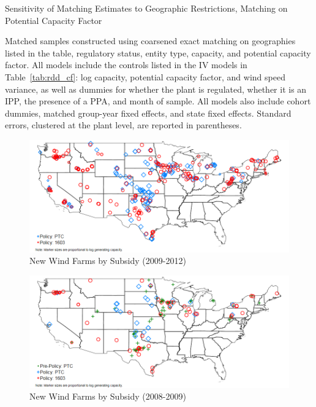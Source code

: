 \documentclass[12pt]{article}
\begin{document}
\begin{table}[h]
\begin{centering}
\caption{Sensitivity of Matching Estimates to Geographic Restrictions, Matching on Potential Capacity Factor \label{tab:matching_table_cf_ptnlcf}}

\par\end{centering}
\footnotesize

Matched samples constructed using coarsened exact matching on geographies listed in the table, regulatory status, entity type, capacity, and potential capacity factor. All models include the controls listed in the IV models in Table~\ref{tab:rdd_cf}: log capacity, potential capacity factor, and wind speed variance, as well as dummies for whether the plant is regulated, whether it is an IPP, the presence of a PPA, and month of sample. All models also include cohort dummies, matched group-year fixed effects, and state fixed effects. Standard errors, clustered at the plant level, are reported in parentheses.
\end{table}


\clearpage


\begin{figure} \centering
	\caption{New Wind Farms by Subsidy (2009-2012)\label{map:2009to2012}}
	\includegraphics[width=\textwidth]{../output/figures/map_2009to2012.png}
\end{figure}

\begin{figure} \centering
	\caption{New Wind Farms by Subsidy (2008-2009)\label{map:2008to2009}}
	\includegraphics[width=\textwidth]{../output/figures/map_2008to2009.png}
\end{figure}
\end{document}
